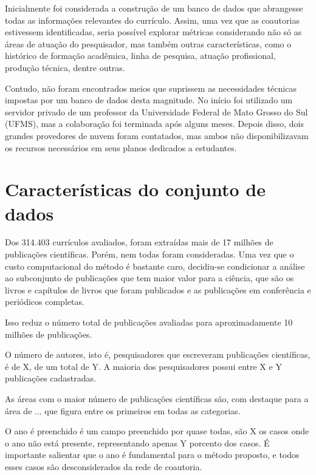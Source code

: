 Inicialmente foi considerada a construção de um banco de dados que abrangesse todas as informações relevantes do currículo. Assim, uma vez que as coautorias estivessem identificadas, seria possível explorar métricas considerando não só as áreas de atuação do pesquisador, mas também outras características, como o histórico de formação acadêmica, linha de pesquisa, atuação profissional, produção técnica, dentre outras.

Contudo, não foram encontrados meios que suprissem as necessidades técnicas impostas por um banco de dados desta magnitude. No início foi utilizado um servidor privado de um professor da Universidade Federal de Mato Grosso do Sul (UFMS), mas a colaboração foi terminada após alguns meses. Depois disso, dois grandes provedores de nuvem foram contatados, mas ambos não disponibilizavam os recursos necessários em seus planos dedicados a estudantes.

\section{Características do conjunto de dados}

Dos 314.403 currículos avaliados, foram extraídas mais de 17 milhões de publicações científicas. Porém, nem todas foram consideradas. Uma vez que o custo computacional do método é bastante caro, decidiu-se condicionar a análise ao subconjunto de publicações que tem maior valor para a ciência, que são os livros e capítulos de livros que foram publicados e as publicações em conferência e periódicos completas.

Isso reduz o número total de publicações avaliadas para aproximadamente 10 milhões de publicações.

O número de autores, isto é, pesquisadores que escreveram publicações científicas, é de X, de um total de Y. A maioria dos pesquisadores possui entre X e Y publicações cadastradas.

As áreas com o maior número de publicações científicas são, com destaque para a área de ... que figura entre os primeiros em todas as categorias.

O ano é preenchido é um campo preenchido por quase todas, são X os casos onde o ano não está presente, representando apenas Y porcento dos casos. É importante salientar que o ano é fundamental para o método proposto, e todos esses casos são desconsiderados da rede de coautoria.